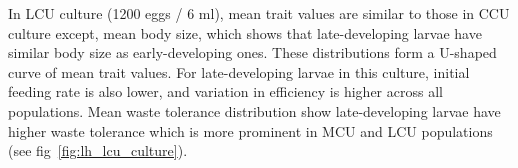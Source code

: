 In LCU culture (1200 eggs / 6 ml), mean trait values are similar to those in CCU culture except, mean body size, which shows that late-developing larvae have similar body size as early-developing ones. These distributions form a U-shaped curve of mean trait values. For late-developing larvae in this culture, initial feeding rate is also lower, and variation in efficiency is higher across all populations. Mean waste tolerance distribution show late-developing larvae have higher waste tolerance which is more prominent in MCU and LCU populations (see fig~\ref{fig:lh_lcu_culture}).
\begin{figure}[p]
  \\
\end{figure}
